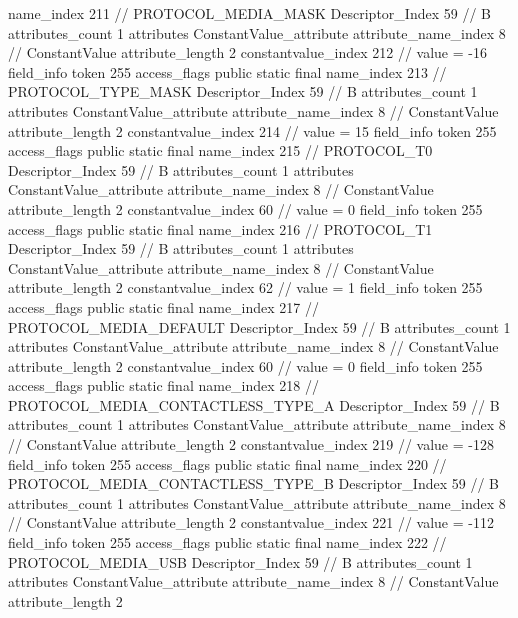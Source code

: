 {{{{{				name_index	211		// PROTOCOL_MEDIA_MASK
				Descriptor_Index	59		// B
				attributes_count	1
				attributes {
				ConstantValue_attribute {
					attribute_name_index	8		// ConstantValue
					attribute_length	2
					constantvalue_index	212		// value = -16
				}
				}
			}
			field_info {
				token	255
				access_flags	public static final
				name_index	213		// PROTOCOL_TYPE_MASK
				Descriptor_Index	59		// B
				attributes_count	1
				attributes {
				ConstantValue_attribute {
					attribute_name_index	8		// ConstantValue
					attribute_length	2
					constantvalue_index	214		// value = 15
				}
				}
			}
			field_info {
				token	255
				access_flags	public static final
				name_index	215		// PROTOCOL_T0
				Descriptor_Index	59		// B
				attributes_count	1
				attributes {
				ConstantValue_attribute {
					attribute_name_index	8		// ConstantValue
					attribute_length	2
					constantvalue_index	60		// value = 0
				}
				}
			}
			field_info {
				token	255
				access_flags	public static final
				name_index	216		// PROTOCOL_T1
				Descriptor_Index	59		// B
				attributes_count	1
				attributes {
				ConstantValue_attribute {
					attribute_name_index	8		// ConstantValue
					attribute_length	2
					constantvalue_index	62		// value = 1
				}
				}
			}
			field_info {
				token	255
				access_flags	public static final
				name_index	217		// PROTOCOL_MEDIA_DEFAULT
				Descriptor_Index	59		// B
				attributes_count	1
				attributes {
				ConstantValue_attribute {
					attribute_name_index	8		// ConstantValue
					attribute_length	2
					constantvalue_index	60		// value = 0
				}
				}
			}
			field_info {
				token	255
				access_flags	public static final
				name_index	218		// PROTOCOL_MEDIA_CONTACTLESS_TYPE_A
				Descriptor_Index	59		// B
				attributes_count	1
				attributes {
				ConstantValue_attribute {
					attribute_name_index	8		// ConstantValue
					attribute_length	2
					constantvalue_index	219		// value = -128
				}
				}
			}
			field_info {
				token	255
				access_flags	public static final
				name_index	220		// PROTOCOL_MEDIA_CONTACTLESS_TYPE_B
				Descriptor_Index	59		// B
				attributes_count	1
				attributes {
				ConstantValue_attribute {
					attribute_name_index	8		// ConstantValue
					attribute_length	2
					constantvalue_index	221		// value = -112
				}
				}
			}
			field_info {
				token	255
				access_flags	public static final
				name_index	222		// PROTOCOL_MEDIA_USB
				Descriptor_Index	59		// B
				attributes_count	1
				attributes {
				ConstantValue_attribute {
					attribute_name_index	8		// ConstantValue
					attribute_length	2
}}}}}}}
